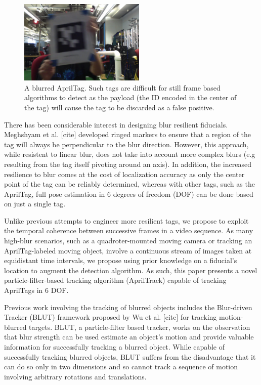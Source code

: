 \documentclass[letterpaper, 10 pt, conference]{ieeeconf}
\begin{document}
\begin{figure}[b]
	\centering
	\includegraphics[width=6cm, height=4cm]{blurred_tag}
	\caption{A blurred AprilTag. Such tags are difficult for still frame based algorithms to detect as the payload (the ID encoded in the center of the tag) will cause the tag to be discarded as a false positive.}
	\label{fig:blurred_tag}
\end{figure}

There has been considerable interest in designing blur resilient fiducials. Meghshyam et al. [cite] developed ringed markers to ensure that a region of the tag will always be perpendicular to the blur direction. However, this approach, while resistent to linear blur, does not take into account more complex blurs (e.g resulting from the tag itself pivoting around an axis). In addition, the increased resilience to blur comes at the cost of localization accuracy as only the center point of the tag can be reliably determined, whereas with other tags, such as the AprilTag, full pose estimation in 6 degrees of freedom (DOF) can be done based on just a single tag.


Unlike previous attempts to engineer more resilient tags, we propose to exploit the temporal coherence between successive frames in a video sequence. As many high-blur scenarios, such as a quadroter-mounted moving camera or tracking an AprilTag-labeled moving object, involve a continuous stream of images taken at equidistant time intervals, we propose using prior knowledge on a fiducial's location to augment the detection algorithm. As such, this paper presents a novel particle-filter-based tracking algorithm (AprilTrack) capable of tracking AprilTags in 6 DOF.
	
Previous work involving the tracking of blurred objects includes the Blur-driven Tracker (BLUT) framework proposed by Wu et al. [cite] for tracking motion-blurred targets. BLUT, a particle-filter based tracker, works on the observation that blur strength can be used estimate an object's motion and provide valuable information for successfully tracking a blurred object. While capable of successfully tracking blurred objects, BLUT suffers from the disadvantage that it can do so only in two dimensions and so cannot track a sequence of motion involving arbitrary rotations and translations.
\end{document}
